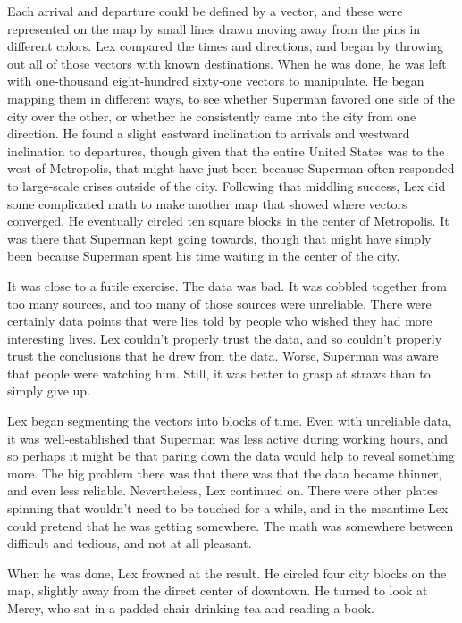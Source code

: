 \documentclass[ebook,12pt]{memoir}
\begin{document}
Each arrival and departure could be defined by a vector, and these were
represented on the map by small lines drawn moving away from the pins in
different colors. Lex compared the times and directions, and began by
throwing out all of those vectors with known destinations. When he was
done, he was left with one‐thousand eight‐hundred sixty‐one vectors to
manipulate. He began mapping them in different ways, to see whether
Superman favored one side of the city over the other, or whether he
consistently came into the city from one direction. He found a slight
eastward inclination to arrivals and westward inclination to departures,
though given that the entire United States was to the west of
Metropolis, that might have just been because Superman often responded
to large‐scale crises outside of the city. Following that middling
success, Lex did some complicated math to make another map that showed
where vectors converged. He eventually circled ten square blocks in the
center of Metropolis. It was there that Superman kept going towards,
though that might have simply been because Superman spent his time
waiting in the center of the city.

It was close to a futile exercise. The data was bad. It was cobbled
together from too many sources, and too many of those sources were
unreliable. There were certainly data points that were lies told by
people who wished they had more interesting lives. Lex couldn't properly
trust the data, and so couldn't properly trust the conclusions that he
drew from the data. Worse, Superman was aware that people were watching
him. Still, it was better to grasp at straws than to simply give up.

Lex began segmenting the vectors into blocks of time. Even with
unreliable data, it was well‐established that Superman was less active
during working hours, and so perhaps it might be that paring down the
data would help to reveal something more. The big problem there was that
there was that the data became thinner, and even less reliable.
Nevertheless, Lex continued on. There were other plates spinning that
wouldn't need to be touched for a while, and in the meantime Lex could
pretend that he was getting somewhere. The math was somewhere between
difficult and tedious, and not at all pleasant.

When he was done, Lex frowned at the result. He circled four city blocks
on the map, slightly away from the direct center of downtown. He turned
to look at Mercy, who sat in a padded chair drinking tea and reading a
book.
\end{document}
